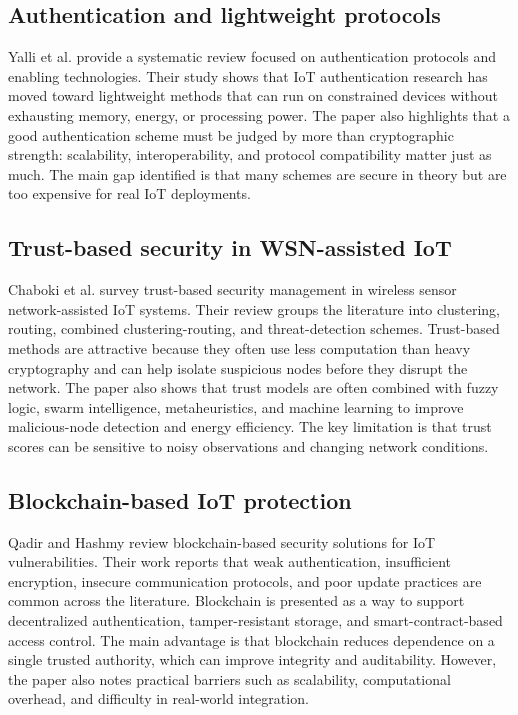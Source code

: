 \documentclass[conference]{IEEEtran}
\begin{document}
\subsection{Authentication and lightweight protocols}
Yalli et al. \cite{yalli} provide a systematic review focused on authentication protocols and enabling technologies. Their study shows that IoT authentication research has moved toward lightweight methods that can run on constrained devices without exhausting memory, energy, or processing power. The paper also highlights that a good authentication scheme must be judged by more than cryptographic strength: scalability, interoperability, and protocol compatibility matter just as much. The main gap identified is that many schemes are secure in theory but are too expensive for real IoT deployments.

\subsection{Trust-based security in WSN-assisted IoT}
Chaboki et al. \cite{trust} survey trust-based security management in wireless sensor network-assisted IoT systems. Their review groups the literature into clustering, routing, combined clustering-routing, and threat-detection schemes. Trust-based methods are attractive because they often use less computation than heavy cryptography and can help isolate suspicious nodes before they disrupt the network. The paper also shows that trust models are often combined with fuzzy logic, swarm intelligence, metaheuristics, and machine learning to improve malicious-node detection and energy efficiency. The key limitation is that trust scores can be sensitive to noisy observations and changing network conditions.

\subsection{Blockchain-based IoT protection}
Qadir and Hashmy \cite{qadir} review blockchain-based security solutions for IoT vulnerabilities. Their work reports that weak authentication, insufficient encryption, insecure communication protocols, and poor update practices are common across the literature. Blockchain is presented as a way to support decentralized authentication, tamper-resistant storage, and smart-contract-based access control. The main advantage is that blockchain reduces dependence on a single trusted authority, which can improve integrity and auditability. However, the paper also notes practical barriers such as scalability, computational overhead, and difficulty in real-world integration.
\end{document}
